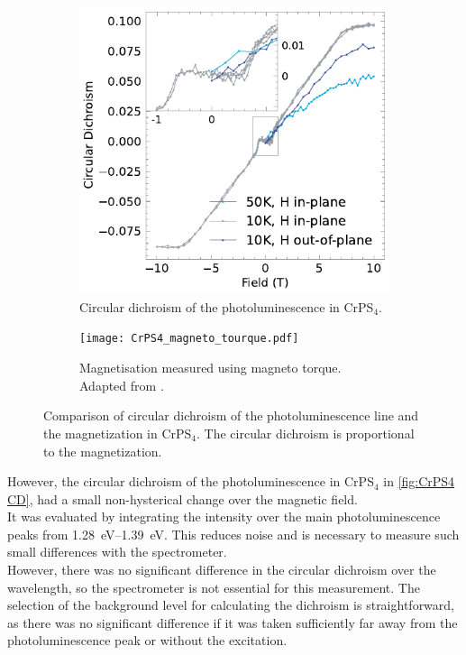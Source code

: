 \documentclass[
	twoside,
	parskip=half,
	a4paper,
]{scrbook}
\begin{document}
\clearpage
\begin{figure}
	\begin{subfigure}[t]{3.5in}
		\vskip 0pt
		\includegraphics{../figures/2023-12-14 CrPS4 circular dichroism.pdf}
		\caption{Circular dichroism of the photoluminescence in CrPS$_4$.}
		\label{fig:CrPS4 CD}
	\end{subfigure}
	\begin{subfigure}[t]{2.5in}
		\vskip 0pt
		\texttt{[image: CrPS4\_magneto\_tourque.pdf]}
		\caption{Magnetisation measured using magneto torque. Adapted from \cite[Figure 2]{CrPS4_magnetic}.}
		\label{fig:CrPS4 magnetic}
	\end{subfigure}
	\caption{Comparison of circular dichroism of the photoluminescence line and the magnetization in CrPS$_4$. The circular dichroism is proportional to the magnetization.}
\end{figure}
However, the circular dichroism of the photoluminescence in CrPS$_4$ in \autoref{fig:CrPS4 CD},
had a small non-hysterical change over the magnetic field.\\
It was evaluated by integrating the intensity over the main photoluminescence peaks from \SIrange{1.28}{1.39}{eV}.
This reduces noise and is necessary to measure such small differences with the spectrometer.\\
However, there was no significant difference in the circular dichroism over the wavelength, so the spectrometer is not essential for this measurement.
The selection of the background level for calculating the dichroism is straightforward, as there was no significant difference if it was taken sufficiently far away from the photoluminescence peak or without the excitation.
\end{document}
